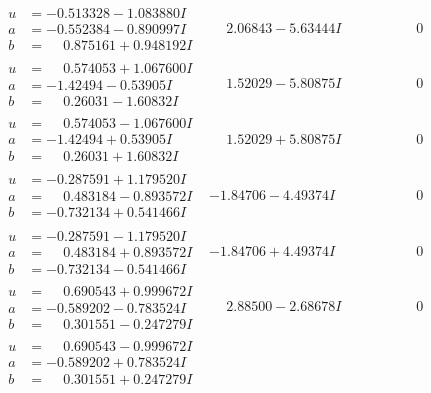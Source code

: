 \documentclass[1p]{elsarticle_modified}
\theoremstyle{definition}
\begin{document}
$$\begin{array}{c|c|c}
\begin{aligned}
u &= -0.513328 - 1.083880 I \\
a &= -0.552384 - 0.890997 I \\
b &= \phantom{-}0.875161 + 0.948192 I\end{aligned}
 & \phantom{-}2.06843 - 5.63444 I & \phantom{-0.000000 } 0 \\ \hline\begin{aligned}
u &= \phantom{-}0.574053 + 1.067600 I \\
a &= -1.42494 - 0.53905 I \\
b &= \phantom{-}0.26031 - 1.60832 I\end{aligned}
 & \phantom{-}1.52029 - 5.80875 I & \phantom{-0.000000 } 0 \\ \hline\begin{aligned}
u &= \phantom{-}0.574053 - 1.067600 I \\
a &= -1.42494 + 0.53905 I \\
b &= \phantom{-}0.26031 + 1.60832 I\end{aligned}
 & \phantom{-}1.52029 + 5.80875 I & \phantom{-0.000000 } 0 \\ \hline\begin{aligned}
u &= -0.287591 + 1.179520 I \\
a &= \phantom{-}0.483184 - 0.893572 I \\
b &= -0.732134 + 0.541466 I\end{aligned}
 & -1.84706 - 4.49374 I & \phantom{-0.000000 } 0 \\ \hline\begin{aligned}
u &= -0.287591 - 1.179520 I \\
a &= \phantom{-}0.483184 + 0.893572 I \\
b &= -0.732134 - 0.541466 I\end{aligned}
 & -1.84706 + 4.49374 I & \phantom{-0.000000 } 0 \\ \hline\begin{aligned}
u &= \phantom{-}0.690543 + 0.999672 I \\
a &= -0.589202 - 0.783524 I \\
b &= \phantom{-}0.301551 - 0.247279 I\end{aligned}
 & \phantom{-}2.88500 - 2.68678 I & \phantom{-0.000000 } 0 \\ \hline\begin{aligned}
u &= \phantom{-}0.690543 - 0.999672 I \\
a &= -0.589202 + 0.783524 I \\
b &= \phantom{-}0.301551 + 0.247279 I\end{aligned}

\end{array}$$
\end{document}
